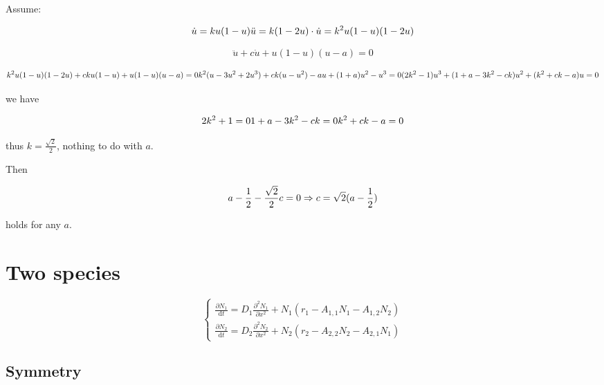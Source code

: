\documentclass[
]{article}
\begin{document}
Assume:

\begin{equation*}
\dot{u} = ku(1-u)\\
\ddot{u} = k(1-2u)\cdot \dot{u} = k^2u(1-u)(1-2u)
\end{equation*}

\begin{equation*}
\ddot{u} + c \dot{u} + u(1-u)(u-a) = 0
\end{equation*}

\begin{equation*}
k^2u(1-u)(1-2u) + c ku(1-u) + u(1-u)(u-a) = 0\\
k^2 (u-3u^2+2u^3) + ck (u-u^2) -au + (1+a)u^2 -u^3 = 0\\
(2k^2-1)u^3 + (1+a-3k^2-ck)u^2 + (k^2+ck-a)u = 0
\end{equation*}

we have

\begin{equation*}
2k^2+1 = 0\\
1+a-3k^2-ck =0\\
k^2+ck-a = 0
\end{equation*}

thus $k = \frac{\sqrt{2}}{2}$, nothing to do with $a$.

Then

\begin{equation*}
a-\frac{1}{2}-\frac{\sqrt{2}}{2}c = 0\\
\Rightarrow c = \sqrt{2}(a - \frac{1}{2})
\end{equation*}

holds for any $a$.

\section{Two species}\label{two-species}

\begin{equation*}
  \begin{cases}
    \frac{\partial N_1}{\mathrm{d}t} = D_{1}\frac{\partial^2 N_1}{\partial x^2} + N_1 \left( r_1 - A_{1,1} N_1 - A_{1,2} N_2 \right)\\ 
    \frac{\partial N_2}{\mathrm{d}t} = D_{2}\frac{\partial^2 N_2}{\partial x^2} + N_2 \left( r_2 - A_{2,2} N_2 - A_{2,1} N_1 \right)
  \end{cases}
\end{equation*}

\subsection{Symmetry}\label{symmetry}
\end{document}
